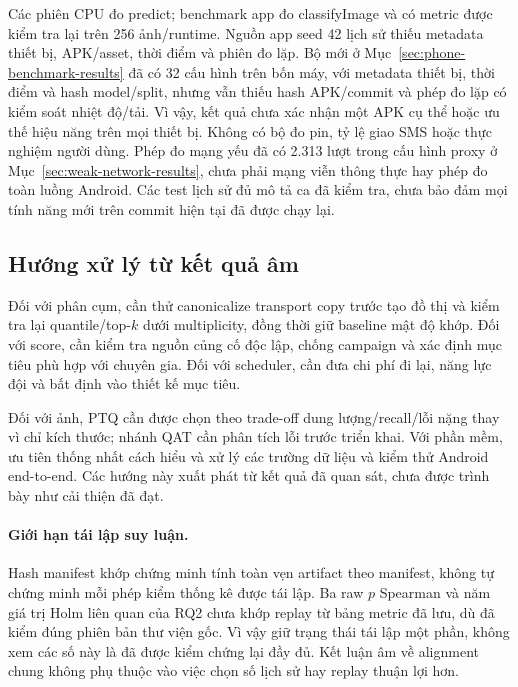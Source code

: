 Các phiên CPU đo predict; benchmark app đo classifyImage và có metric được kiểm tra lại trên 256 ảnh/runtime. Nguồn app seed 42 lịch sử thiếu metadata thiết bị, APK/asset, thời điểm và phiên đo lặp. Bộ mới ở Mục~\ref{sec:phone-benchmark-results} đã có 32 cấu hình trên bốn máy, với metadata thiết bị, thời điểm và hash model/split, nhưng vẫn thiếu hash APK/commit và phép đo lặp có kiểm soát nhiệt độ/tải. Vì vậy, kết quả chưa xác nhận một APK cụ thể hoặc ưu thế hiệu năng trên mọi thiết bị. Không có bộ đo pin, tỷ lệ giao SMS hoặc thực nghiệm người dùng. Phép đo mạng yếu đã có 2.313 lượt trong cấu hình proxy ở Mục~\ref{sec:weak-network-results}, chưa phải mạng viễn thông thực hay phép đo toàn luồng Android. Các test lịch sử đủ mô tả ca đã kiểm tra, chưa bảo đảm mọi tính năng mới trên commit hiện tại đã được chạy lại.

\subsection{Hướng xử lý từ kết quả âm}
Đối với phân cụm, cần thử canonicalize transport copy trước tạo đồ thị và kiểm tra lại quantile/top-$k$ dưới multiplicity, đồng thời giữ baseline mật độ khớp. Đối với score, cần kiểm tra nguồn củng cố độc lập, chống campaign và xác định mục tiêu phù hợp với chuyên gia. Đối với scheduler, cần đưa chi phí đi lại, năng lực đội và bất định vào thiết kế mục tiêu.

Đối với ảnh, PTQ cần được chọn theo trade-off dung lượng/recall/lỗi nặng thay vì chỉ kích thước; nhánh QAT cần phân tích lỗi trước triển khai. Với phần mềm, ưu tiên thống nhất cách hiểu và xử lý các trường dữ liệu và kiểm thử Android end-to-end. Các hướng này xuất phát từ kết quả đã quan sát, chưa được trình bày như cải thiện đã đạt.

\paragraph{Giới hạn tái lập suy luận.} Hash manifest khớp chứng minh tính toàn vẹn artifact theo manifest, không tự chứng minh mỗi phép kiểm thống kê được tái lập. Ba raw $p$ Spearman và năm giá trị Holm liên quan của RQ2 chưa khớp replay từ bảng metric đã lưu, dù đã kiểm đúng phiên bản thư viện gốc. Vì vậy giữ trạng thái tái lập một phần, không xem các số này là đã được kiểm chứng lại đầy đủ. Kết luận âm về alignment chung không phụ thuộc vào việc chọn số lịch sử hay replay thuận lợi hơn.


